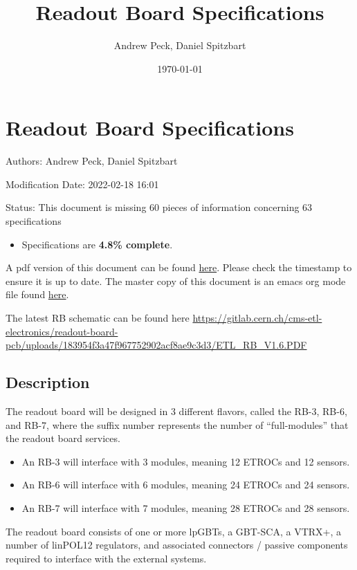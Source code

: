 \documentclass[11pt]{article}
\author{Andrew Peck, Daniel Spitzbart}
\date{\today}
\title{Readout Board Specifications}
\begin{document}
\maketitle

\section{Readout Board Specifications}
\label{sec:orgf41ee40}

Authors: Andrew Peck, Daniel Spitzbart

Modification Date: 2022-02-18 16:01

Status: This document is missing 60 pieces of information concerning  63 specifications
\begin{itemize}
\item Specifications are \textbf{4.8\% complete}.
\end{itemize}

A pdf version of this document can be found \href{./rb-specs.pdf}{here}. Please check the timestamp to ensure it is up to date. The master copy of this document is an emacs org mode file found \href{https://gitlab.cern.ch/cms-etl-electronics/readout-board-docs/-/blob/master/docs/Specifications/rb-specs.org}{here}.

The latest RB schematic can be found here \url{https://gitlab.cern.ch/cms-etl-electronics/readout-board-pcb/uploads/183954f3a47f967752902acf8ae9c3d3/ETL\_RB\_V1.6.PDF}

\setcounter{tocdepth}{3}
\tableofcontents

\subsection{Description}
\label{sec:org34cfd03}

The readout board will be designed in 3 different flavors, called the RB-3, RB-6, and RB-7, where the suffix number represents the number of ``full-modules'' that the readout board services.

\begin{itemize}
\item An RB-3 will interface with 3 modules, meaning 12 ETROCs and 12 sensors.
\item An RB-6 will interface with 6 modules, meaning 24 ETROCs and 24 sensors.
\item An RB-7 will interface with 7 modules, meaning 28 ETROCs and 28 sensors.
\end{itemize}

The readout board consists of one or more lpGBTs, a GBT-SCA, a VTRX+, a number of linPOL12 regulators, and associated connectors / passive components required to interface with the external systems.
\end{document}
